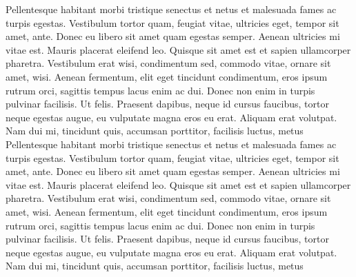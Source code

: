 Pellentesque habitant morbi tristique senectus et netus et malesuada fames ac turpis egestas. Vestibulum tortor quam, feugiat vitae, ultricies eget, tempor sit amet, ante. Donec eu libero sit amet quam egestas semper. Aenean ultricies mi vitae est. Mauris placerat eleifend leo. Quisque sit amet est et sapien ullamcorper pharetra. Vestibulum erat wisi, condimentum sed, commodo vitae, ornare sit amet, wisi. Aenean fermentum, elit eget tincidunt condimentum, eros ipsum rutrum orci, sagittis tempus lacus enim ac dui. Donec non enim in turpis pulvinar facilisis. Ut felis. Praesent dapibus, neque id cursus faucibus, tortor neque egestas augue, eu vulputate magna eros eu erat. Aliquam erat volutpat. Nam dui mi, tincidunt quis, accumsan porttitor, facilisis luctus, metus
Pellentesque habitant morbi tristique senectus et netus et malesuada fames ac turpis egestas. Vestibulum tortor quam, feugiat vitae, ultricies eget, tempor sit amet, ante. Donec eu libero sit amet quam egestas semper. Aenean ultricies mi vitae est. Mauris placerat eleifend leo. Quisque sit amet est et sapien ullamcorper pharetra. Vestibulum erat wisi, condimentum sed, commodo vitae, ornare sit amet, wisi. Aenean fermentum, elit eget tincidunt condimentum, eros ipsum rutrum orci, sagittis tempus lacus enim ac dui. Donec non enim in turpis pulvinar facilisis. Ut felis. Praesent dapibus, neque id cursus faucibus, tortor neque egestas augue, eu vulputate magna eros eu erat. Aliquam erat volutpat. Nam dui mi, tincidunt quis, accumsan porttitor, facilisis luctus, metus
